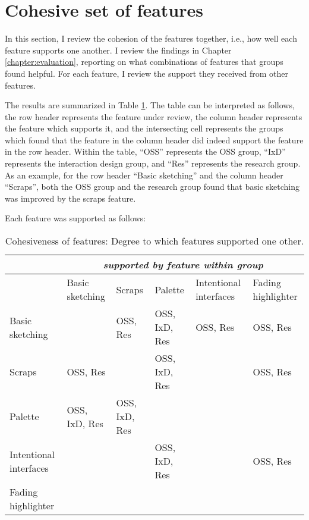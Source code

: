 \section{Cohesive set of features}
\label{chapter:discussion:cohesive-features}

In this section, I review the cohesion of the features together, i.e., how well each feature supports one another. I review the findings in Chapter \ref{chapter:evaluation}, reporting on what combinations of features that groups found helpful. For each feature, I review the support they received from other features. 

The results are summarized in Table \ref{table:cohesiveness}. The table can be interpreted as follows, the row header represents the feature under review, the column header represents the feature which supports it, and the intersecting cell represents the groups which found that the feature in the column header did indeed support the feature in the row header. Within the table, ``OSS'' represents the OSS group, ``IxD'' represents the interaction design group, and ``Res'' represents the research group. As an example, for the row header ``Basic sketching'' and the column header ``Scraps'', both the OSS group and the research group found that basic sketching was improved by the scraps feature. 

Each feature was supported as follows:

\begin{table}
\centering
\caption{Cohesiveness of features: Degree to which features supported one other.}
\begin{tabular}{ |p{2cm}|p{2cm}|p{2cm}|p{2cm}|p{2cm}|p{2cm}|}
\hline
&\multicolumn{5}{c|}{\textit{supported by feature within group}} \\
\hline
&Basic sketching &Scraps &Palette &Intentional interfaces & Fading highlighter	\\[5ex]
\hline
Basic sketching &  &	OSS, Res &OSS, IxD, Res &OSS, Res & OSS, Res	\\[5ex]
\hline
Scraps & OSS, Res &  & OSS, IxD, Res &  & OSS, Res	\\[5ex]
\hline
Palette & OSS, IxD, Res & OSS, IxD, Res &  &  &	\\[5ex]
\hline
Intentional interfaces&  &  & OSS, IxD, Res &	 & OSS, Res	\\[5ex]
\hline
Fading highlighter& 	 &	 &	 &	 & \\[5ex]
\hline
\end{tabular}
\label{table:cohesiveness}
\end{table}

